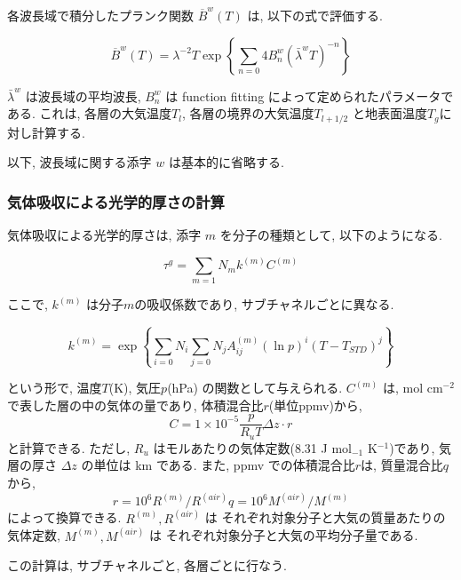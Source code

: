 各波長域で積分したプランク関数 $\overline{B}^w(T)$ は,
以下の式で評価する.

\begin{equation}
  \overline{B}^w(T) 
   = \lambda^{-2} T \exp \left\{ \sum_{n=0}{4} B^w_n (\bar{\lambda}^w T)^{-n}
                         \right\}
\end{equation}

$\bar{\lambda}^w$ は波長域の平均波長,
$B^w_n$ は function fitting によって定められたパラメータである.
これは, 各層の大気温度$T_l$, 各層の境界の大気温度$T_{l+1/2}$
と地表面温度$T_g$に対し計算する.

以下, 波長域に関する添字 $w$ は基本的に省略する.

\subsubsection{気体吸収による光学的厚さの計算 }

気体吸収による光学的厚さは, 添字 $m$ を分子の種類として,
以下のようになる. 

\begin{equation}
  \tau^g = \sum_{m=1}{N_m} k^{(m)} C^{(m)}
\end{equation}

ここで, $k^{(m)}$ は分子$m$の吸収係数であり, サブチャネルごとに異なる.

\begin{equation}
 k^{(m)} = \exp\left\{ \sum_{i=0}{N_i} \sum_{j=0}{N_j} A^{(m)}_{ij}
                   (\ln p)^{i} (T-T_{STD})^{j}
               \right\}
\end{equation}

という形で, 温度$T$(K), 気圧$p$(hPa) の関数として与えられる.
$C^{(m)}$ は, mol cm$^{-2}$ で表した層の中の気体の量であり,
体積混合比$r$(単位ppmv)から,
\begin{equation}
  C = 1\times 10^{-5} \frac{p}{R_u T} \Delta z \cdot r
\end{equation}
と計算できる. 
ただし, $R_u$ はモルあたりの気体定数(8.31 J mol$_{-1}$ K$^{-1}$)であり,
気層の厚さ $\Delta z$ の単位は km である.
また, ppmv での体積混合比$r$は, 
質量混合比$q$から, 
\begin{equation}
  r = 10^6 R^{(m)}/R^{(air)} q = 10^6 M^{(air)}/M^{(m)}
\end{equation}
によって換算できる.
$R^{(m)},R^{(air)}$ は
それぞれ対象分子と大気の質量あたりの気体定数,
$M^{(m)},M^{(air)}$ は
それぞれ対象分子と大気の平均分子量である.

この計算は, サブチャネルごと, 各層ごとに行なう.

